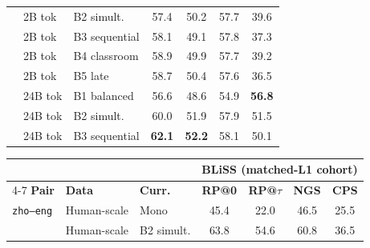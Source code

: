 \begin{table}[t]
\begin{minipage}[t]{0.49\linewidth}
\begin{tabular}{ll l cccc}
 & 2B tok & B2 simult. & \cellcolor[rgb]{0.923,1.000,0.923} 57.4 & \cellcolor[rgb]{0.997,1.000,0.997} 50.2 & \cellcolor[rgb]{0.898,1.000,0.898} 57.7 & \cellcolor[rgb]{1.000,0.885,0.885} 39.6 \\
 & 2B tok & B3 sequential & \cellcolor[rgb]{0.916,1.000,0.916} 58.1 & \cellcolor[rgb]{1.000,0.991,0.991} 49.1 & \cellcolor[rgb]{0.897,1.000,0.897} 57.8 & \cellcolor[rgb]{1.000,0.860,0.860} 37.3 \\
 & 2B tok & B4 classroom & \cellcolor[rgb]{0.907,1.000,0.907} 58.9 & \cellcolor[rgb]{1.000,0.999,0.999} 49.9 & \cellcolor[rgb]{0.898,1.000,0.898} 57.7 & \cellcolor[rgb]{1.000,0.881,0.881} 39.2 \\
 & 2B tok & B5 late & \cellcolor[rgb]{0.909,1.000,0.909} 58.7 & \cellcolor[rgb]{0.995,1.000,0.995} 50.4 & \cellcolor[rgb]{0.899,1.000,0.899} 57.6 & \cellcolor[rgb]{1.000,0.851,0.851} 36.5 \\
\addlinespace[1.5pt]
 & 24B tok & B1 balanced & \cellcolor[rgb]{0.931,1.000,0.931} 56.6 & \cellcolor[rgb]{1.000,0.987,0.987} 48.6 & \cellcolor[rgb]{0.935,1.000,0.935} 54.9 & \cellcolor[rgb]{0.861,1.000,0.861} \textbf{56.8} \\
 & 24B tok & B2 simult. & \cellcolor[rgb]{0.896,1.000,0.896} 60.0 & \cellcolor[rgb]{0.976,1.000,0.976} 51.9 & \cellcolor[rgb]{0.895,1.000,0.895} 57.9 & \cellcolor[rgb]{0.969,1.000,0.969} 51.5 \\
 & 24B tok & B3 sequential & \cellcolor[rgb]{0.874,1.000,0.874} \textbf{62.1} & \cellcolor[rgb]{0.972,1.000,0.972} \textbf{52.2} & \cellcolor[rgb]{0.893,1.000,0.893} 58.1 & \cellcolor[rgb]{0.998,1.000,0.998} 50.1 \\
\bottomrule
\end{tabular}
\end{minipage}\hfill
\begin{minipage}[t]{0.49\linewidth}\centering
\begin{tabular}{ll l cccc}
\toprule
& & & \multicolumn{4}{c}{\textbf{BLiSS (matched-L1 cohort)}} \\
\cmidrule(lr){4-7}
\textbf{Pair} & \textbf{Data} & \textbf{Curr.} & \textbf{RP@0} & \textbf{RP@$\tau$} & \textbf{NGS} & \textbf{CPS} \\
\midrule
\texttt{zho--eng} & Human-scale & Mono & \cellcolor[rgb]{1.000,0.730,0.730} 45.4 & \cellcolor[rgb]{1.000,0.730,0.730} 22.0 & \cellcolor[rgb]{1.000,0.730,0.730} 46.5 & \cellcolor[rgb]{1.000,0.730,0.730} 25.5 \\
 & Human-scale & B2 simult. & \cellcolor[rgb]{0.856,1.000,0.856} 63.8 & \cellcolor[rgb]{0.942,1.000,0.942} 54.6 & \cellcolor[rgb]{0.857,1.000,0.857} 60.8 & \cellcolor[rgb]{1.000,0.851,0.851} 36.5 \\

\end{tabular}
\end{minipage}
\end{table}
